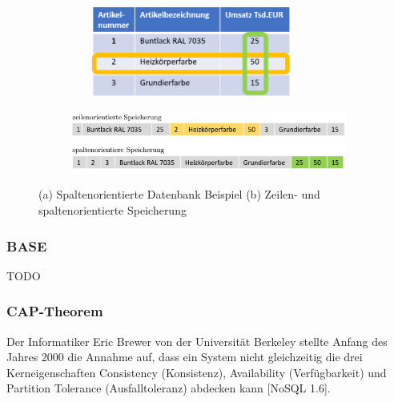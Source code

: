 \begin{figure}[tbt]
	\begin{subfigure}{\textwidth}
		\centering
		\includegraphics[width=8cm, height = 3cm]{images/SpaltenorientiereDatenbank.png}
		\caption{}
		\label{fig:spalten_zeilen_speicher}
	\end{subfigure}
	\newline
	\begin{subfigure}{\textwidth}
		\centering
		\includegraphics[width=15cm]{images/zeilenspaltenorientiert.png}
		\caption{ }
		\label{fig:spalten_zeilen}
	\end{subfigure}
	\caption[(a) Spaltenorientierte Datenbank Beispiel (b) Zeilen- und spaltenorientierte Speicherung]{(a) Spaltenorientierte Datenbank Beispiel (b) Zeilen- und spaltenorientierte Speicherung \protect \footnotemark}
\end{figure}

\subsubsection{BASE}
TODO
\newline

\subsubsection{CAP-Theorem}
Der Informatiker Eric Brewer von der Universität Berkeley stellte Anfang des Jahres 2000 die Annahme auf, dass ein System nicht gleichzeitig die drei Kerneigenschaften Consistency (Konsistenz), Availability (Verfügbarkeit) und Partition Tolerance (Ausfalltoleranz) abdecken kann [NoSQL 1.6]. 
\newline

